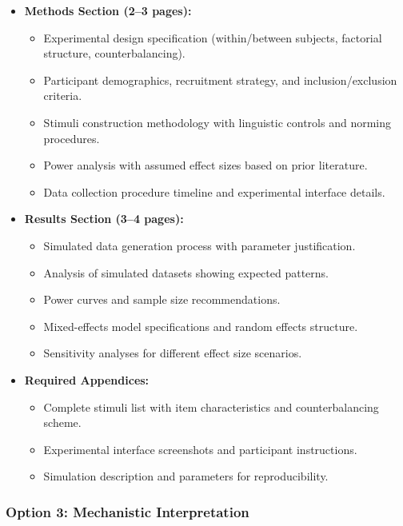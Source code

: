 \documentclass[10pt,letterpaper]{article}
\begin{document}
\begin{graybox}
\begin{itemize}
  \item \textbf{Methods Section (2--3 pages):}
    \begin{itemize}
      \item Experimental design specification (within/between subjects, factorial structure, counterbalancing).
      \item Participant demographics, recruitment strategy, and inclusion/exclusion criteria.
      \item Stimuli construction methodology with linguistic controls and norming procedures.
      \item Power analysis with assumed effect sizes based on prior literature.
      \item Data collection procedure timeline and experimental interface details.
    \end{itemize}
  \item \textbf{Results Section (3--4 pages):}
    \begin{itemize}
      \item Simulated data generation process with parameter justification.
      \item Analysis of simulated datasets showing expected patterns.
      \item Power curves and sample size recommendations.
      \item Mixed-effects model specifications and random effects structure.
      \item Sensitivity analyses for different effect size scenarios.
    \end{itemize}
  \item \textbf{Required Appendices:}
    \begin{itemize}
      \item Complete stimuli list with item characteristics and counterbalancing scheme.
      \item Experimental interface screenshots and participant instructions.
      \item Simulation description and parameters for reproducibility.
    \end{itemize}
\end{itemize}
\end{graybox}

\subsubsection{Option 3: Mechanistic Interpretation}
\end{document}
